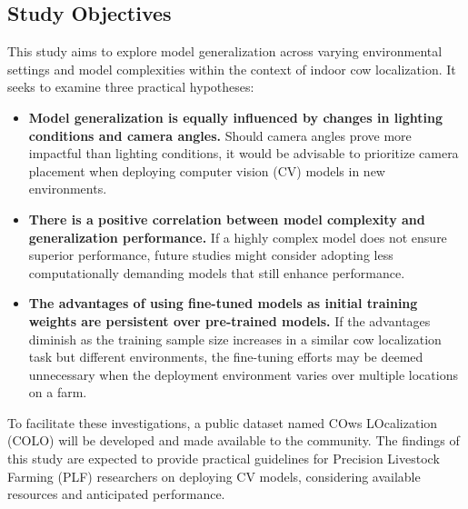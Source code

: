 \subsection*{Study Objectives}

This study aims to explore model generalization across varying environmental settings and model complexities within the context of indoor cow localization. It seeks to examine three practical hypotheses:

\begin{itemize}
    \item \textbf{Model generalization is equally influenced by changes in lighting conditions and camera angles.} Should camera angles prove more impactful than lighting conditions, it would be advisable to prioritize camera placement when deploying computer vision (CV) models in new environments.
    \item \textbf{There is a positive correlation between model complexity and generalization performance.} If a highly complex model does not ensure superior performance, future studies might consider adopting less computationally demanding models that still enhance performance.
    \item \textbf{The advantages of using fine-tuned models as initial training weights are persistent over pre-trained models.} If the advantages diminish as the training sample size increases in a similar cow localization task but different environments, the fine-tuning efforts may be deemed unnecessary when the deployment environment varies over multiple locations on a farm.
\end{itemize}

To facilitate these investigations, a public dataset named COws LOcalization (COLO) \cite{COLODataset2023} will be developed and made available to the community. The findings of this study are expected to provide practical guidelines for Precision Livestock Farming (PLF) researchers on deploying CV models, considering available resources and anticipated performance.